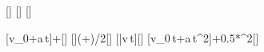 [\mps]
[\s]
[\mpss]

[v_0+a\,t]{\vVaX+\aVbX*\tVbX}[\mps]
[]{(\vVaX+\vVeX)/2}[\mps]
[\bar v\,t]{\vVmX*\tVbX}[\m]
[v_0\,t+a\,t^2]{\vVaX*\tVbX+0.5*\aVbX*\tVbX^2}[\m]
